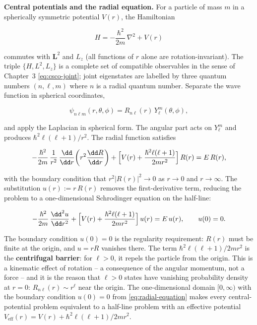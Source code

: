\medskip\noindent\textbf{Central potentials and the radial equation.}
For a particle of mass $m$ in a spherically symmetric potential $V(r)$, the Hamiltonian
\begin{linenomath}
  \begin{equation}
    H = -\frac{\hbar^2}{2m}\,\nabla^2 + V(r)
  \end{equation}
\end{linenomath}
commutes with $\bm L^2$ and $L_z$ (all functions of $r$ alone are rotation-invariant). The triple $\{H, L^2, L_z\}$ is a complete set of compatible observables in the sense of Chapter~3 \eqref{eq:csco-joint}; joint eigenstates are labelled by three quantum numbers $(n,\ell,m)$ where $n$ is a radial quantum number. Separate the wave function in spherical coordinates,
\begin{linenomath}
  \begin{equation}
    \psi_{n\ell m}(r,\theta,\phi) = R_{n\ell}(r)\,Y_\ell^m(\theta,\phi),
  \end{equation}
\end{linenomath}
and apply the Laplacian in spherical form. The angular part acts on $Y_\ell^m$ and produces $\hbar^2\ell(\ell+1)/r^2$. The radial function satisfies
\begin{linenomath}
  \begin{equation}
    -\frac{\hbar^2}{2m}\,
    \frac{1}{r^2}\,\frac{\dd}{\dd r}\!\left(r^2\frac{\dd R}{\dd r}\right)
    + \Bigl[V(r) + \frac{\hbar^2\ell(\ell+1)}{2mr^2}\Bigr]\,R(r)
    = E\,R(r),
    \label{eq:radial-equation}
  \end{equation}
\end{linenomath}
with the boundary condition that $r^2|R(r)|^2 \to 0$ as $r \to 0$ and $r \to \infty$. The substitution $u(r) := r\,R(r)$ removes the first-derivative term, reducing the problem to a one-dimensional Schrodinger equation on the half-line:
\begin{linenomath}
  \begin{equation}
    -\frac{\hbar^2}{2m}\,\frac{\dd^2 u}{\dd r^2}
    + \Bigl[V(r) + \frac{\hbar^2\ell(\ell+1)}{2mr^2}\Bigr]\,u(r)
    = E\,u(r),
    \qquad
    u(0) = 0.
  \end{equation}
\end{linenomath}
The boundary condition $u(0) = 0$ is the regularity requirement: $R(r)$ must be finite at the origin, and $u = rR$ vanishes there. The term $\hbar^2\ell(\ell+1)/2mr^2$ is the \textbf{centrifugal barrier}: for $\ell > 0$, it repels the particle from the origin. This is a kinematic effect of rotation -- a consequence of the angular momentum, not a force -- and it is the reason that $\ell > 0$ states have vanishing probability density at $r = 0$: $R_{n\ell}(r) \sim r^\ell$ near the origin. The one-dimensional domain $[0,\infty)$ with the boundary condition $u(0)=0$ from \eqref{eq:radial-equation} makes every central-potential problem equivalent to a half-line problem with an effective potential $V_{\text{eff}}(r) = V(r) + \hbar^2\ell(\ell+1)/2mr^2$.

